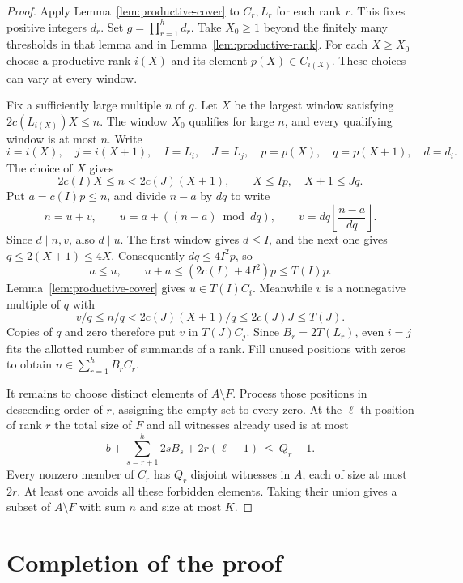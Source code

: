 \documentclass[11pt,reqno]{amsart}
\theoremstyle{definition}
\theoremstyle{remark}
\begin{document}
\begin{proof}
Apply Lemma~\ref{lem:productive-cover} to \(C_r,L_r\) for each rank
\(r\). This fixes positive integers \(d_r\). Set \(g=\prod_{r=1}^h d_r\).
Take \(X_0\ge1\) beyond the finitely many thresholds in that lemma
and in Lemma~\ref{lem:productive-rank}. For each \(X\ge X_0\) choose
a productive rank \(i(X)\) and its element \(p(X)\in C_{i(X)}\).
These choices can vary at every window.

Fix a sufficiently large multiple \(n\) of \(g\). Let \(X\) be the
largest window satisfying \(2c(L_{i(X)})X\le n\). The window \(X_0\)
qualifies for large \(n\), and every qualifying window is at most
\(n\). Write
\[
    i=i(X),\quad j=i(X+1),\quad I=L_i,\quad J=L_j,\quad
    p=p(X),\quad q=p(X+1),\quad d=d_i .
\]
The choice of \(X\) gives
\[
    2c(I)X\le n<2c(J)(X+1),\qquad
    X\le Ip,\quad X+1\le Jq .
\]
Put \(a=c(I)p\le n\), and divide \(n-a\) by \(dq\) to write
\[
     n=u+v,\qquad u=a+((n-a)\bmod dq),\qquad
     v=dq\left\lfloor\frac{n-a}{dq}\right\rfloor .
\]
Since \(d\mid n,v\), also \(d\mid u\). The first window gives
\(d\le I\), and the next one gives \(q\le2(X+1)\le4X\).
Consequently \(dq\le4I^2p\), so
\[
 a\le u,\qquad u+a\le (2c(I)+4I^2)p\le T(I)p.
\]
Lemma~\ref{lem:productive-cover} gives \(u\in T(I)C_i\).
Meanwhile \(v\) is a nonnegative multiple of \(q\) with
\[
    v/q\le n/q<2c(J)(X+1)/q\le2c(J)J\le T(J).
\]
Copies of \(q\) and zero therefore put \(v\) in \(T(J)C_j\).
Since \(B_r=2T(L_r)\), even \(i=j\) fits the allotted number of
summands of a rank. Fill unused positions with zeros to obtain
\(n\in\sum_{r=1}^h B_rC_r\).

It remains to choose distinct elements of \(A\setminus F\).
Process those positions in descending order of \(r\), assigning the
empty set to every zero. At the \(\ell\)-th position of rank \(r\)
the total size of \(F\) and all witnesses already used is at most
\[
       b+\sum_{s=r+1}^h 2sB_s+2r(\ell-1)\ \le\ Q_r-1 .
\]
Every nonzero member of \(C_r\) has \(Q_r\) disjoint witnesses in
\(A\), each of size at most \(2r\). At least one avoids all these
forbidden elements. Taking their union gives a subset of
\(A\setminus F\) with sum \(n\) and size at most \(K\).
\end{proof}

\section{Completion of the proof}\label{sec:conclusion}
\end{document}
